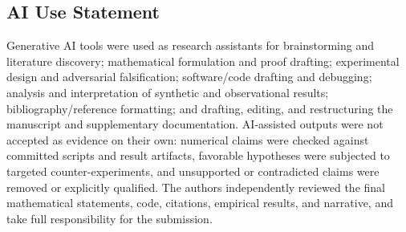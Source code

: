\documentclass[twoside]{article}
\theoremstyle{definition}
\begin{document}
\subsection*{AI Use Statement}
Generative AI tools were used as research assistants for brainstorming and literature discovery; mathematical formulation and proof drafting; experimental design and adversarial falsification; software/code drafting and debugging; analysis and interpretation of synthetic and observational results; bibliography/reference formatting; and drafting, editing, and restructuring the manuscript and supplementary documentation. AI-assisted outputs were not accepted as evidence on their own: numerical claims were checked against committed scripts and result artifacts, favorable hypotheses were subjected to targeted counter-experiments, and unsupported or contradicted claims were removed or explicitly qualified. The authors independently reviewed the final mathematical statements, code, citations, empirical results, and narrative, and take full responsibility for the submission.
\end{document}
